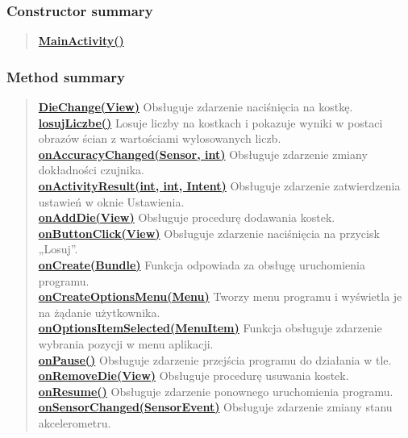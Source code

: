 \documentclass[11pt,a4paper]{article}
\begin{document}
{{{{\subsubsection{Constructor summary}{
\begin{verse}
\hyperlink{com.example.kostkadogry.MainActivity()}{{\bf MainActivity()}} \\
\end{verse}
}
\subsubsection{Method summary}{
\begin{verse}
\hyperlink{com.example.kostkadogry.MainActivity.DieChange(View)}{{\bf DieChange(View)}} Obsługuje zdarzenie naciśnięcia na kostkę.\\
\hyperlink{com.example.kostkadogry.MainActivity.losujLiczbe()}{{\bf losujLiczbe()}} Losuje liczby na kostkach i pokazuje wyniki w postaci obrazów ścian z wartościami wylosowanych liczb.\\
\hyperlink{com.example.kostkadogry.MainActivity.onAccuracyChanged(Sensor, int)}{{\bf onAccuracyChanged(Sensor, int)}} Obsługuje zdarzenie zmiany dokładności czujnika.\\
\hyperlink{com.example.kostkadogry.MainActivity.onActivityResult(int, int, Intent)}{{\bf onActivityResult(int, int, Intent)}} Obsługuje zdarzenie zatwierdzenia ustawień w oknie Ustawienia.\\
\hyperlink{com.example.kostkadogry.MainActivity.onAddDie(View)}{{\bf onAddDie(View)}} Obsługuje procedurę dodawania kostek.\\
\hyperlink{com.example.kostkadogry.MainActivity.onButtonClick(View)}{{\bf onButtonClick(View)}} Obsługuje zdarzenie naciśnięcia na przycisk „Losuj”.\\
\hyperlink{com.example.kostkadogry.MainActivity.onCreate(Bundle)}{{\bf onCreate(Bundle)}} Funkcja odpowiada za obsługę uruchomienia programu.\\
\hyperlink{com.example.kostkadogry.MainActivity.onCreateOptionsMenu(Menu)}{{\bf onCreateOptionsMenu(Menu)}} Tworzy menu programu i wyświetla je na żądanie użytkownika.\\
\hyperlink{com.example.kostkadogry.MainActivity.onOptionsItemSelected(MenuItem)}{{\bf onOptionsItemSelected(MenuItem)}} Funkcja obsługuje zdarzenie wybrania pozycji w menu aplikacji.\\
\hyperlink{com.example.kostkadogry.MainActivity.onPause()}{{\bf onPause()}} Obsługuje zdarzenie przejścia programu do działania w tle.\\
\hyperlink{com.example.kostkadogry.MainActivity.onRemoveDie(View)}{{\bf onRemoveDie(View)}} Obsługuje procedurę usuwania kostek.\\
\hyperlink{com.example.kostkadogry.MainActivity.onResume()}{{\bf onResume()}} Obsługuje zdarzenie ponownego uruchomienia programu.\\
\hyperlink{com.example.kostkadogry.MainActivity.onSensorChanged(SensorEvent)}{{\bf onSensorChanged(SensorEvent)}} Obsługuje zdarzenie zmiany stanu akcelerometru.\\
\end{verse}
}
}}}}
\end{document}
